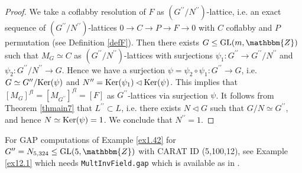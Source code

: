 \documentclass{amsart}
\theoremstyle{plain}
\theoremstyle{definition}
\theoremstyle{remark}
\newcommand{\bZ}{\mathbbm{Z}}\newcommand{\bQ}{\mathbbm{Q}}
\newcommand{\GL}{{\rm GL}}\newcommand{\SL}{{\rm SL}}
\newcounter{sub}\def\tr{\mbox{tr }}
\begin{document}
{\begin{proof}
We take a coflabby resolution of $F$ 
as $(G^{\prime\prime}/N^{\prime\prime})$-lattice, 
i.e. an exact sequence of 
$(G^{\prime\prime}/N^{\prime\prime})$-lattices 
$0\to C\to P\to F\to 0$ 
with $C$ coflabby and $P$ permutation (see Definition \ref{defF}). 
Then there exists $G\leq {\rm GL}(m,\bZ)$ 
such that $M_{G}\simeq C$ as $(G^{\prime\prime}/N^{\prime\prime})$-lattices 
with surjections 
$\psi_1: G^{\prime\prime}\to G^{\prime\prime}/N^{\prime\prime}$ 
and
$\psi_2: G^{\prime\prime}/N^{\prime\prime}\to G$. 
Hence 
we have a 
surjection $\psi=\psi_2\circ\psi_1: G^{\prime\prime}\to G$, 
i.e. $G\simeq G^{\prime\prime}/{\rm Ker}(\psi)$ 
and $N^{\prime\prime}={\rm Ker}(\psi_1)\lhd {\rm Ker}(\psi)$. 
This implies that $[M_G]^{fl}=[M_{G^{\prime\prime}}]^{fl}=[F]$ 
as $G^{\prime\prime}$-lattices via surjection $\psi$. 
It follows from Theorem \ref{thmain7} that 
$L^{\prime\prime}\subset L$, 
i.e. there exists $N\lhd G$ such that $G/N\simeq G^{\prime\prime}$, 
and hence $N\simeq {\rm Ker}(\psi)=1$. 
We conclude that $N^{\prime\prime}=1$. 
\end{proof}

For GAP computations of Example \ref{ex1.42} for $G^{\prime\prime}=N_{5,324}\leq \GL(5,\bZ)$ with CARAT ID (5,100,12), see Example \ref{ex12.1} which needs {\tt MultInvField.gap} 
which is available as in \cite{MultInvField}.\\

}
\end{document}
